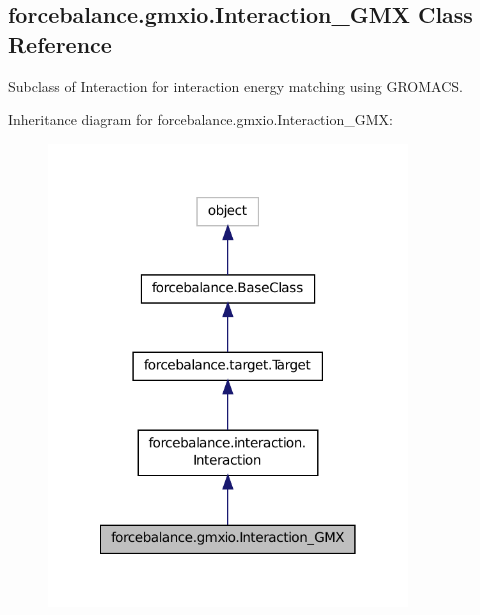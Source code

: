 \hypertarget{classforcebalance_1_1gmxio_1_1Interaction__GMX}{\subsection{forcebalance.\-gmxio.\-Interaction\-\_\-\-G\-M\-X Class Reference}
\label{classforcebalance_1_1gmxio_1_1Interaction__GMX}
}


Subclass of Interaction for interaction energy matching using G\-R\-O\-M\-A\-C\-S.  




Inheritance diagram for forcebalance.\-gmxio.\-Interaction\-\_\-\-G\-M\-X\-:
\nopagebreak
\begin{figure}[H]
\begin{center}
\leavevmode
\includegraphics[width=270pt]{classforcebalance_1_1gmxio_1_1Interaction__GMX__inherit__graph}
\end{center}
\end{figure}


